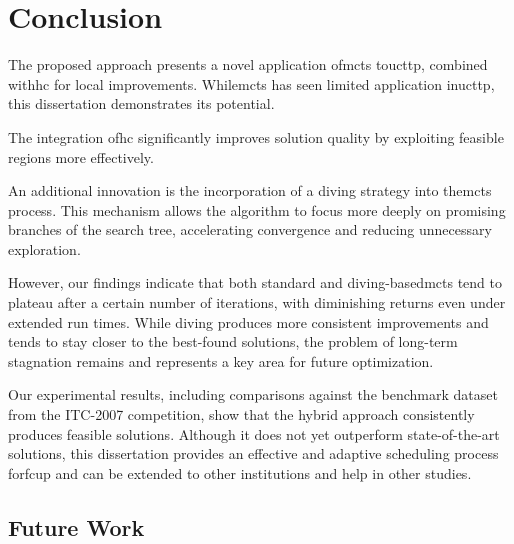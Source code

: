 \pretocmd{\chapter}{\glsresetall}{}{}


\chapter{Conclusion}


\label{Conclusion}

The proposed approach presents a novel application of\ac{mcts} to\ac{ucttp}, combined with\ac{hc} for local improvements. While\ac{mcts} has seen limited application in\ac{ucttp}, this dissertation demonstrates its potential.

The integration of\ac{hc} significantly improves solution quality by exploiting feasible regions more effectively.

An additional innovation is the incorporation of a diving strategy into the\ac{mcts} process. This mechanism allows the algorithm to focus more deeply on promising branches of the search tree, accelerating convergence and reducing unnecessary exploration.

However, our findings indicate that both standard and diving-based\ac{mcts} tend to plateau after a certain number of iterations, with diminishing returns even under extended run times. While diving produces more consistent improvements and tends to stay closer to the best-found solutions, the problem of long-term stagnation remains and represents a key area for future optimization.

Our experimental results, including comparisons against the benchmark dataset from the ITC-2007 competition, show that the hybrid approach consistently produces feasible solutions. Although it does not yet outperform state-of-the-art solutions, this dissertation provides an effective and adaptive scheduling process for\ac{fcup} and can be extended to other institutions and help in other studies. 

\section{Future Work}

